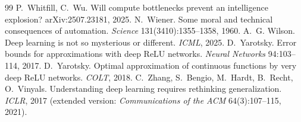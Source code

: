 \begin{thebibliography}{99}
 P.~Whitfill, C.~Wu. Will compute bottlenecks prevent an intelligence explosion? arXiv:2507.23181, 2025.
 N.~Wiener. Some moral and technical consequences of automation. \emph{Science} 131(3410):1355--1358, 1960.
 A.~G. Wilson. Deep learning is not so mysterious or different. \emph{ICML}, 2025.
 D.~Yarotsky. Error bounds for approximations with deep ReLU networks. \emph{Neural Networks} 94:103--114, 2017.
 D.~Yarotsky. Optimal approximation of continuous functions by very deep ReLU networks. \emph{COLT}, 2018.
 C.~Zhang, S.~Bengio, M.~Hardt, B.~Recht, O.~Vinyals. Understanding deep learning requires rethinking generalization. \emph{ICLR}, 2017 (extended version: \emph{Communications of the ACM} 64(3):107--115, 2021).
\end{thebibliography}

